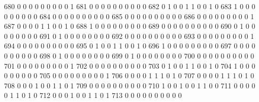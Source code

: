 \documentclass[compress,8pt]{beamer}
\begin{document}
\begin{frame}
\begin{Schunk}
  680      0       0   0              0        0    0       0       0   0   1
  681      0       0   0              0        0    0       0       0   0   0
  682      0       1   0              0        1    1       0       0   1   0
  683      1       0   0              0        0    0       0       0   0   0
  684      0       0   0              0        0    0       0       0   0   0
  685      0       0   0              0        0    0       0       0   0   0
  686      0       0   0              0        0    0       0       0   0   1
  687      0       0   0              0        1    1       0       0   1   0
  688      1       0   0              0        0    0       0       0   0   0
  689      0       0   0              0        0    0       0       0   0   0
  690      0       1   0              0        0    0       0       0   0   0
  691      0       1   0              0        0    0       0       0   0   0
  692      0       0   0              0        0    0       0       0   0   0
  693      0       0   0              0        0    0       0       0   0   1
  694      0       0   0              0        0    0       0       0   0   0
  695      0       1   0              0        1    1       0       0   1   0
  696      1       0   0              0        0    0       0       0   0   0
  697      0       0   0              0        0    0       0       0   0   0
  698      0       1   0              0        0    0       0       0   0   0
  699      0       1   0              0        0    0       0       0   0   0
  700      0       0   0              0        0    0       0       0   0   0
  701      0       0   0              0        0    0       0       0   0   1
  702      0       0   0              0        0    0       0       0   0   0
  703      0       1   0              0        1    1       0       0   1   0
  704      1       0   0              0        0    0       0       0   0   0
  705      0       0   0              0        0    0       0       0   0   1
  706      0       0   0              0        1    1       1       0   1   0
  707      0       0   0              0        1    1       1       0   1   0
  708      0       0   0              1        0    0       1       1   0   1
  709      0       0   0              0        0    0       0       0   0   0
  710      1       0   0              1        0    0       1       1   0   0
  711      0       0   0              0        0    1       1       0   1   0
  712      0       0   0              1        0    0       1       1   0   1
  713      0       0   0              0        0    0       0       0   0   0

\end{Schunk}
\end{frame}
\end{document}
